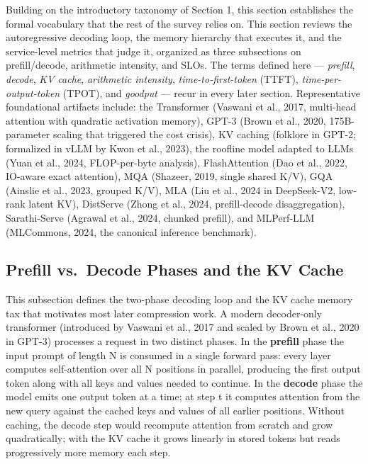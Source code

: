 \documentclass{article}
\begin{document}
Building on the introductory taxonomy of Section 1, this section establishes the formal vocabulary that the rest of the survey relies on. This section reviews the autoregressive decoding loop, the memory hierarchy that executes it, and the service-level metrics that judge it, organized as three subsections on prefill/decode, arithmetic intensity, and SLOs. The terms defined here --- \emph{prefill}, \emph{decode}, \emph{KV cache}, \emph{arithmetic intensity}, \emph{time-to-first-token} (TTFT), \emph{time-per-output-token} (TPOT), and \emph{goodput} --- recur in every later section. Representative foundational artifacts include: the Transformer (Vaswani et al., 2017, multi-head attention with quadratic activation memory), GPT-3 (Brown et al., 2020, 175B-parameter scaling that triggered the cost crisis), KV caching (folklore in GPT-2; formalized in vLLM by Kwon et al., 2023), the roofline model adapted to LLMs (Yuan et al., 2024, FLOP-per-byte analysis), FlashAttention (Dao et al., 2022, IO-aware exact attention), MQA (Shazeer, 2019, single shared K/V), GQA (Ainslie et al., 2023, grouped K/V), MLA (Liu et al., 2024 in DeepSeek-V2, low-rank latent KV), DistServe (Zhong et al., 2024, prefill-decode disaggregation), Sarathi-Serve (Agrawal et al., 2024, chunked prefill), and MLPerf-LLM (MLCommons, 2024, the canonical inference benchmark).

\subsection{Prefill vs.~Decode Phases and the KV Cache}\label{prefill-vs.-decode-phases-and-the-kv-cache}

This subsection defines the two-phase decoding loop and the KV cache memory tax that motivates most later compression work. A modern decoder-only transformer (introduced by Vaswani et al., 2017 and scaled by Brown et al., 2020 in GPT-3) processes a request in two distinct phases. In the \textbf{prefill} phase the input prompt of length N is consumed in a single forward pass: every layer computes self-attention over all N positions in parallel, producing the first output token along with all keys and values needed to continue. In the \textbf{decode} phase the model emits one output token at a time; at step t it computes attention from the new query against the cached keys and values of all earlier positions. Without caching, the decode step would recompute attention from scratch and grow quadratically; with the KV cache it grows linearly in stored tokens but reads progressively more memory each step.
\end{document}
